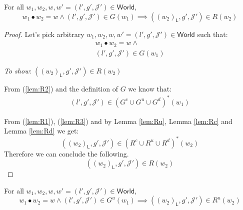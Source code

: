 \lem \label{lem:R} For all $w_1, w_2, w, w' = (l', g', \mathcal{J}') \in \mathsf{World}$,
\[
	w_1 \bullet w_2 = w \land (l', g', \mathcal{J}') \in G(w_1) \implies ((w_2)_\mathsf{L}, g', \mathcal{J}') \in R(w_2)
\]

{\parindent0pt
\begin{proof}
Let's pick arbitrary $w_1, w_2, w, w' = (l', g', \mathcal{J}') \in \mathsf{World}$ such that:
\begin{gather}
	\label{lem:R1} w_1 \bullet w_2 = w \land
	\\
	\label{lem:R2} (l', g', \mathcal{J}') \in G(w_1)
\end{gather}

\textit{To show}: $((w_2)_\mathsf{L}, g', \mathcal{J}') \in R(w_2)$

From (\ref{lem:R2}) and the definition of $G$ we know that:
\begin{gather}
	\label{lem:R3} (l', g', \mathcal{J}') \in (G^c \cup G^u \cup G^d)^*(w_1)
\end{gather}

From (\ref{lem:R1}), (\ref{lem:R3}) and by Lemma \ref{lem:Ru}, Lemma \ref{lem:Rc} and Lemma \ref{lem:Rd} we get:
\[
	((w_2)_\mathsf{L}, g', \mathcal{J}') \in (R^c \cup R^u \cup R^d)^*(w_2)
\]
Therefore we can conclude the following.
\[
	((w_2)_\mathsf{L}, g', \mathcal{J}') \in R(w_2)
\]
\end{proof}
}

\lem \label{lem:Ru} For all $w_1, w_2, w, w' = (l', g', \mathcal{J}') \in \mathsf{World}$,
\[
	w_1 \bullet w_2 = w \land (l', g', \mathcal{J}') \in G^u(w_1) \implies ((w_2)_\mathsf{L}, g', \mathcal{J}') \in R^u(w_2)
\]

